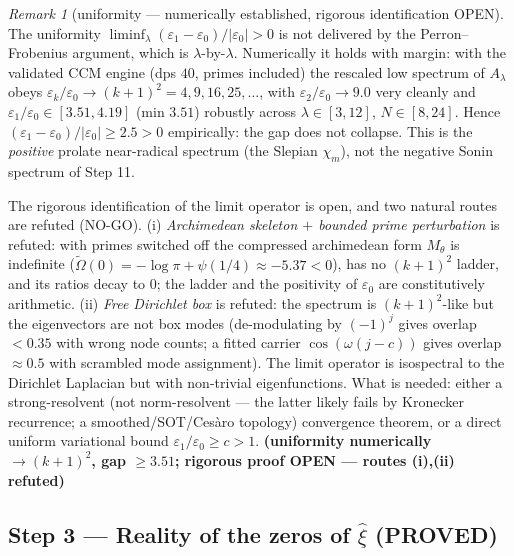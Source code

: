 \documentclass[11pt]{article}
\theoremstyle{remark}
\newtheorem{remark}[theorem]{Remark}
\newcommand{\ve}{\varepsilon}
\newcommand{\PROVED}{\textbf{(PROVED)}}
\begin{document}
\begin{remark}[uniformity --- numerically established, rigorous identification OPEN]
The uniformity $\liminf_\lambda(\ve_1-\ve_0)/|\ve_0|>0$ is not delivered by the
Perron--Frobenius argument, which is $\lambda$-by-$\lambda$. Numerically it holds with
margin: with the validated CCM engine (dps $40$, primes included) the rescaled low
spectrum of $A_\lambda$ obeys $\ve_k/\ve_0\to(k+1)^2=4,9,16,25,\dots$, with
$\ve_2/\ve_0\to9.0$ very cleanly and $\ve_1/\ve_0\in[3.51,4.19]$ (min $3.51$) robustly
across $\lambda\in[3,12]$, $N\in[8,24]$. Hence $(\ve_1-\ve_0)/|\ve_0|\ge2.5>0$
empirically: the gap does not collapse. This is the \emph{positive} prolate near-radical
spectrum (the Slepian $\chi_m$), not the negative Sonin spectrum of Step 11.

The rigorous identification of the limit operator is open, and two natural routes are
refuted (NO-GO). (i) \emph{Archimedean skeleton $+$ bounded prime perturbation} is
refuted: with primes switched off the compressed archimedean form $M_\theta$ is indefinite
($\widetilde\Omega(0)=-\log\pi+\psi(1/4)\approx-5.37<0$), has no $(k+1)^2$ ladder, and its
ratios decay to $0$; the ladder and the positivity of $\ve_0$ are constitutively
arithmetic. (ii) \emph{Free Dirichlet box} is refuted: the spectrum is $(k+1)^2$-like but
the eigenvectors are not box modes (de-modulating by $(-1)^j$ gives overlap $<0.35$ with
wrong node counts; a fitted carrier $\cos(\omega(j-c))$ gives overlap $\approx0.5$ with
scrambled mode assignment). The limit operator is isospectral to the Dirichlet Laplacian
but with non-trivial eigenfunctions. What is needed: either a strong-resolvent (not
norm-resolvent --- the latter likely fails by Kronecker recurrence; a smoothed/SOT/Ces\`aro
topology) convergence theorem, or a direct uniform variational bound $\ve_1/\ve_0\ge c>1$.
\textbf{(uniformity numerically $\to(k+1)^2$, gap $\ge3.51$; rigorous proof OPEN ---
routes (i),(ii) refuted)}
\end{remark}

\subsection{Step 3 --- Reality of the zeros of $\hat\xi$ \PROVED}
\end{document}
